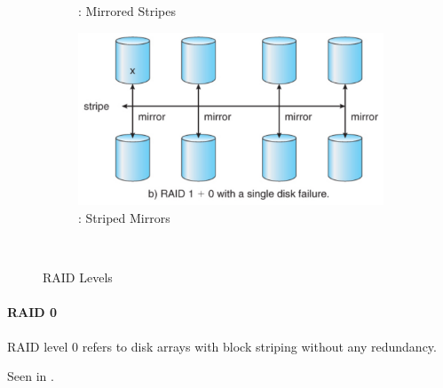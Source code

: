 \begin{figure}[h!tbp]
\begin{subfigure}{0.45\linewidth}
    \caption{: Mirrored Stripes}
    \label{subfig:RAID_01}
  \end{subfigure}
  \begin{subfigure}{0.45\linewidth}
    \centering
    \includegraphics[scale=1.00]{./Drawings/EDAF35-Operating_Systems/RAID_10.png}
    \caption{: Striped Mirrors}
    \label{subfig:RAID_10}
  \end{subfigure} \\
  \caption{RAID Levels}
  \label{fig:RAID_Levels}
\end{figure}

\paragraph{RAID 0}\label{par:RAID_0}
RAID level 0 refers to disk arrays with block striping without any redundancy.

Seen in .


